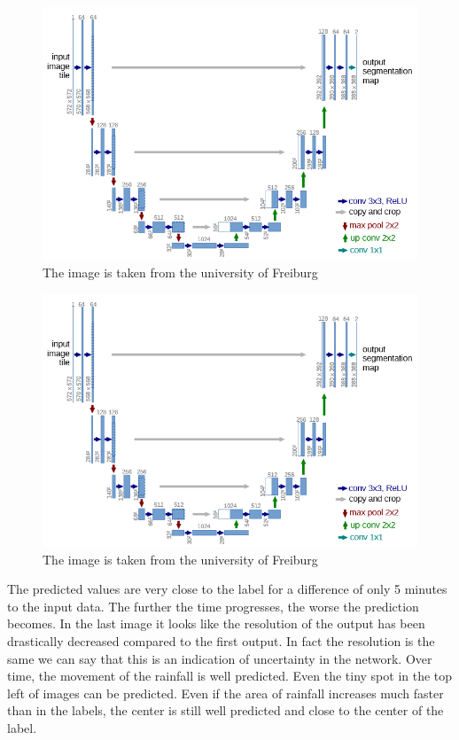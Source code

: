 \documentclass[oneside]{htwg-report}
\begin{document}
\begin{figure}[ht]
    \centering
    \includegraphics[width=0.8\linewidth]{../pics/UNet_Biomedical}
    \caption{The image is taken from the university of Freiburg~\cite{ronneberger2015u}}
\end{figure}


\begin{figure}[ht]
    \centering
    \includegraphics[width=0.8\linewidth]{../pics/UNet_Biomedical}
    \caption{The image is taken from the university of Freiburg~\cite{ronneberger2015u}}
\end{figure}

The predicted values are very close to the label for a difference of only 5 minutes to the input data. The further the time progresses, the worse the prediction becomes.
In the last image it looks like the resolution of the output has been drastically decreased compared to the first output. 
In fact the resolution is the same we can say that this is an indication of uncertainty in the network.
Over time, the movement of the rainfall is well predicted. Even the tiny spot in the top left of images can be predicted.
Even if the area of rainfall increases much faster than in the labels, the center is still well predicted and close to the center of the label.
\end{document}
